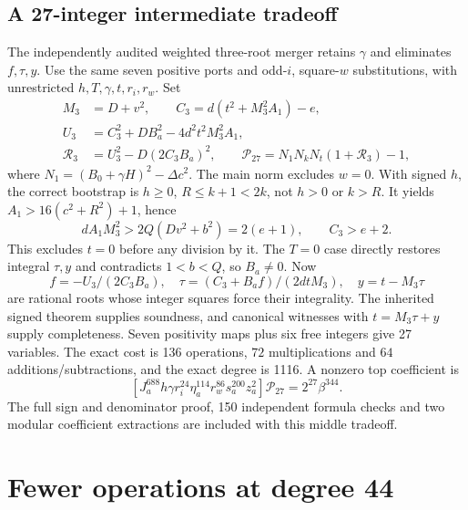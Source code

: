 \documentclass[11pt]{article}
\begin{document}
\subsection{A 27-integer intermediate tradeoff}
The independently audited weighted three-root merger retains $\gamma$ and eliminates $f,\tau,y$. Use the same seven positive ports and odd-$i$, square-$w$ substitutions, with unrestricted $h,T,\gamma,t,r_i,r_w$. Set
\begin{align*}
 M_3&=D+v^2,\qquad C_3=d(t^2+M_3^2A_1)-e,\\
 U_3&=C_3^2+DB_a^2-4d^2t^2M_3^2A_1,\\
 \mathcal R_3&=U_3^2-D(2C_3B_a)^2,\qquad
 \mathcal P_{27}=N_1N_kN_t(1+\mathcal R_3)-1,
\end{align*}
where $N_1=(B_0+\gamma H)^2-\Delta c^2$. The main norm excludes $w=0$. With signed $h$, the correct bootstrap is $h\ge0$, $R\le k+1<2k$, not $h>0$ or $k>R$. It yields $A_1>16(c^2+R^2)+1$, hence
\[
 dA_1M_3^2>2Q(Dv^2+b^2)=2(e+1),\qquad C_3>e+2.
\]
This excludes $t=0$ before any division by it. The $T=0$ case directly restores integral $\tau,y$ and contradicts $1<b<Q$, so $B_a\ne0$. Now
\[
 f=-U_3/(2C_3B_a),\quad
 \tau=(C_3+B_af)/(2dtM_3),\quad y=t-M_3\tau
\]
are rational roots whose integer squares force their integrality. The inherited signed theorem supplies soundness, and canonical witnesses with $t=M_3\tau+y$ supply completeness. Seven positivity maps plus six free integers give 27 variables. The exact cost is 136 operations, $72$ multiplications and $64$ additions/subtractions, and the exact degree is 1116. A nonzero top coefficient is
\[
 [J_a^{688}h\gamma r_i^{24}\eta_a^{114}r_w^{86}s_a^{200}z_a^2]
 \mathcal P_{27}=2^{27}\beta^{344}.
\]
The full sign and denominator proof, 150 independent formula checks and two modular coefficient extractions are included with this middle tradeoff.

\section{Fewer operations at degree 44}\label{sec:grouped}
\end{document}

